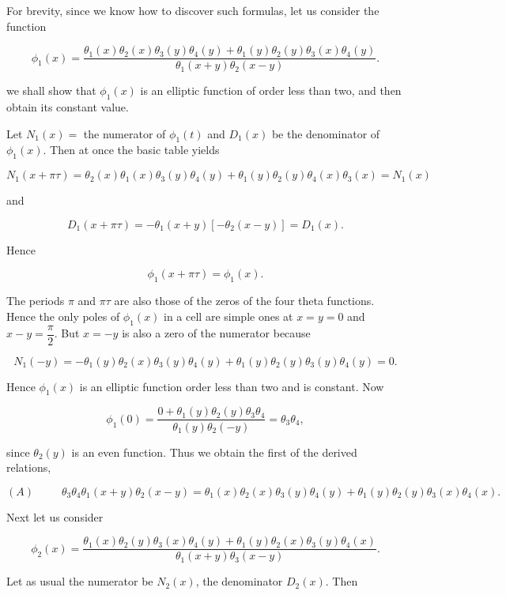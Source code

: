 \begin{solution}
For brevity, since we know how to discover such formulas, let us consider the function

$$\phi_1(x) = \dfrac{\theta_1(x) \theta_2(x) \theta_3(y) \theta_4(y) + \theta_1(y) \theta_2(y) \theta_3(x) \theta_4(y)}{\theta_1(x+y) \theta_2(x-y)}.$$

we shall show that $\phi_1(x)$ is an elliptic function of order less than two, and then obtain its constant value.

Let $N_1(x) =$ the numerator of $\phi_1(t)$ and $D_1(x)$ be the denominator of $\phi_1(x)$. Then at once the basic table yields

$$N_1(x+\pi \tau) = \theta_2(x) \theta_1(x) \theta_3(y) \theta_4(y) + \theta_1(y) \theta_2(y) \theta_4(x) \theta_3(x) = N_1(x)$$

and

$$D_1(x+\pi \tau) = -\theta_1(x+y)[-\theta_2(x-y)]=D_1(x).$$

Hence

$$\phi_1(x+\pi \tau) = \phi_1(x).$$

The periods $\pi$ and $\pi \tau$ are also those of the zeros of the four theta functions. Hence the only poles of $\phi_1(x)$ in a cell are simple ones at $x=y=0$ and $x-y =\dfrac{\pi}{2}$. But $x=-y$ is also a zero of the numerator because

$$N_1(-y) = -\theta_1(y)\theta_2(x)\theta_3(y)\theta_4(y)+\theta_1(y) \theta_2(y)\theta_3(y)\theta_4(y)=0.$$

Hence $\phi_1(x)$ is an elliptic function order less than two and is constant. Now

$$\phi_1(0) = \dfrac{0 + \theta_1(y) \theta_2(y) \theta_3 \theta_4}{\theta_1(y) \theta_2(-y)} = \theta_3 \theta_4,$$

since $\theta_2(y)$ is an even function. Thus we obtain the first of the derived relations,

$$(A) \hspace{30pt} \theta_3\theta_4\theta_1(x+y) \theta_2(x-y) = \theta_1(x) \theta_2(x) \theta_3(y) \theta_4(y) + \theta_1(y) \theta_2(y) \theta_3(x) \theta_4(x).$$

Next let us consider

$$\phi_2(x) = \dfrac{\theta_1(x) \theta_2(y) \theta_3(x) \theta_4(y) + \theta_1(y) \theta_2(x) \theta_3(y) \theta_4(x)}{\theta_1(x+y) \theta_3(x-y)}.$$

Let as usual the numerator be $N_2(x)$, the denominator $D_2(x).$ Then


\end{solution}
